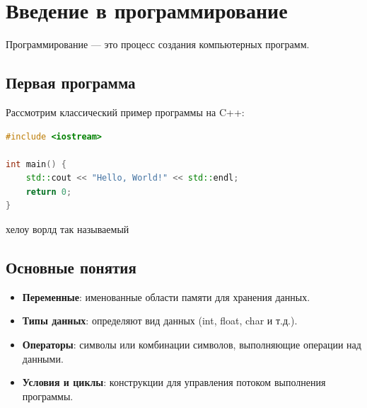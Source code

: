 


\section{Введение в программирование}

Программирование — это процесс создания компьютерных программ.

\subsection{Первая программа}

Рассмотрим классический пример программы на C++:

\begin{lstlisting}[language=C++]
#include <iostream>

int main() {
    std::cout << "Hello, World!" << std::endl;
    return 0;
}
\end{lstlisting}

хелоу ворлд так называемый
\subsection{Основные понятия}
\begin{itemize}
    \item \textbf{Переменные}: именованные области памяти для хранения данных.
    \item \textbf{Типы данных}: определяют вид данных (int, float, char и т.д.).
    \item \textbf{Операторы}: символы или комбинации символов, выполняющие операции над данными.
    \item \textbf{Условия и циклы}: конструкции для управления потоком выполнения программы.
\end{itemize}


